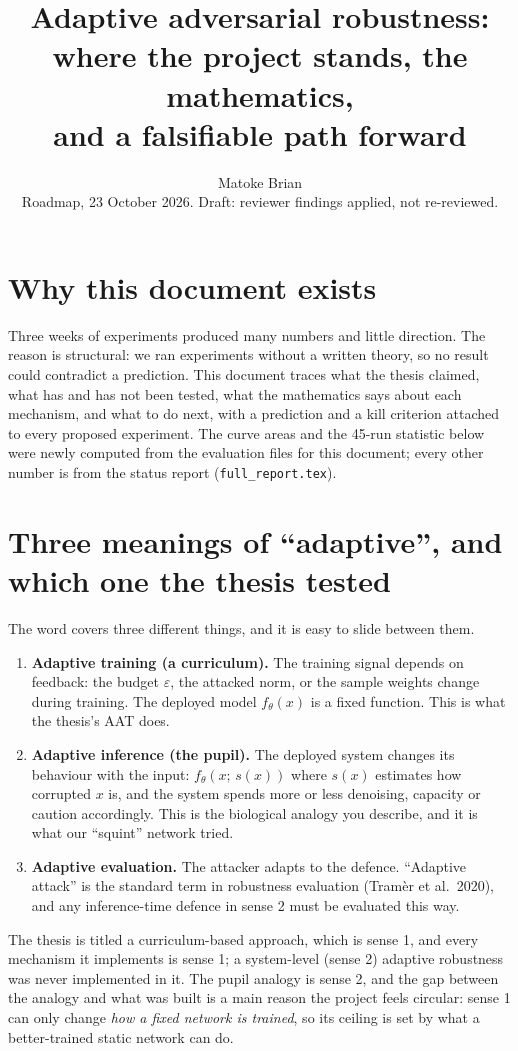 \documentclass[11pt]{article}
\title{Adaptive adversarial robustness: where the project stands, the mathematics,\\and a falsifiable path forward}
\author{Matoke Brian\\\small Roadmap, 23 October 2026. Draft: reviewer findings applied, not re-reviewed.}
\date{}
\begin{document}
\maketitle
\section{Why this document exists}
Three weeks of experiments produced many numbers and little direction. The reason is structural: we ran experiments without a written theory, so no result could contradict a prediction.
This document traces what the thesis claimed, what has and has not been tested, what the mathematics says about each mechanism, and what to do next, with a prediction and a kill criterion attached to every proposed experiment.
The curve areas and the 45-run statistic below were newly computed from the evaluation files for this document; every other number is from the status report (\texttt{full\_report.tex}).

\section{Three meanings of ``adaptive'', and which one the thesis tested}
The word covers three different things, and it is easy to slide between them.
\begin{enumerate}
\item \textbf{Adaptive training (a curriculum).} The training signal depends on feedback: the budget $\varepsilon$, the attacked norm, or the sample weights change during training. The deployed model $f_\theta(x)$ is a fixed function. This is what the thesis's AAT does.
\item \textbf{Adaptive inference (the pupil).} The deployed system changes its behaviour with the input: $f_\theta(x;\,s(x))$ where $s(x)$ estimates how corrupted $x$ is, and the system spends more or less denoising, capacity or caution accordingly. This is the biological analogy you describe, and it is what our ``squint'' network tried.
\item \textbf{Adaptive evaluation.} The attacker adapts to the defence. ``Adaptive attack'' is the standard term in robustness evaluation (Tram\`er et al.\ 2020), and any inference-time defence in sense 2 must be evaluated this way.
\end{enumerate}
The thesis is titled a curriculum-based approach, which is sense 1, and every mechanism it implements is sense 1; a system-level (sense 2) adaptive robustness was never implemented in it. The pupil analogy is sense 2, and the gap between the analogy and what was built is a main reason the project feels circular: sense 1 can only change \emph{how a fixed network is trained}, so its ceiling is set by what a better-trained static network can do.
\end{document}

